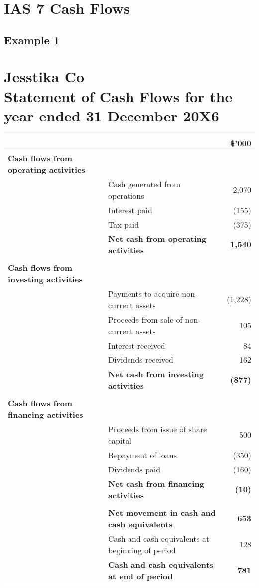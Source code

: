 \section{IAS 7 Cash Flows}


\subsection{Example 1}
\section*{Jesstika Co\\Statement of Cash Flows for the year ended 31 December 20X6}

\begin{tabular}{@{}llr@{}}
\toprule
\textbf{} & \textbf{} & \textbf{\$’000} \\
\midrule
\textbf{Cash flows from operating activities} & & \\
& Cash generated from operations & 2,070 \\
& Interest paid & (155) \\
& Tax paid & (375) \\
& \textbf{Net cash from operating activities} & \textbf{1,540} \\
\\
\textbf{Cash flows from investing activities} & & \\
& Payments to acquire non-current assets & (1,228) \\
& Proceeds from sale of non-current assets & 105 \\
& Interest received & 84 \\
& Dividends received & 162 \\
& \textbf{Net cash from investing activities} & \textbf{(877)} \\
\\
\textbf{Cash flows from financing activities} & & \\
& Proceeds from issue of share capital & 500 \\
& Repayment of loans & (350) \\
& Dividends paid & (160) \\
& \textbf{Net cash from financing activities} & \textbf{(10)} \\
\\
& \textbf{Net movement in cash and cash equivalents} & \textbf{653} \\
& Cash and cash equivalents at beginning of period & 128 \\
& \textbf{Cash and cash equivalents at end of period} & \textbf{781} \\
\bottomrule
\end{tabular}

